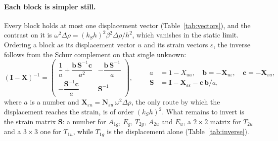 \documentclass[11pt,a4paper]{article}
\newcommand{\bN}{\mathbf{N}}
\newcommand{\bI}{\mathbf{I}}
\begin{document}
\paragraph{Each block is simpler still.} Every block holds at most one displacement vector
(Table~\ref{tab:vectors}), and the contrast on it is $\omega^2\Delta\rho=(k_Sh)^2\beta^2\Delta\rho/h^2$, which
vanishes in the static limit. Ordering a block as its displacement vector $u$ and its strain vectors
$\varepsilon$, the inverse follows from the Schur complement on that single unknown:
\begin{equation}\label{eq:schurcomplement}
  (\bI-\mathbf X)^{-1}=
  \begin{pmatrix}
    \dfrac1a+\dfrac{\mathbf b\,\mathbf S^{-1}\mathbf c}{a^2} & -\dfrac{\mathbf b\,\mathbf S^{-1}}{a}\\[8pt]
    -\dfrac{\mathbf S^{-1}\mathbf c}{a} & \mathbf S^{-1}
  \end{pmatrix},\qquad
  \begin{aligned}
    a&=1-X_{uu},\quad \mathbf b=-\mathbf X_{u\varepsilon},\quad \mathbf c=-\mathbf X_{\varepsilon u},\\
    \mathbf S&=\bI-\mathbf X_{\varepsilon\varepsilon}-\mathbf c\,\mathbf b/a ,
  \end{aligned}
\end{equation}
where $a$ is a number and $\mathbf X_{\varepsilon u}=\bN_{\varepsilon u}\,\omega^2\Delta\rho$, the only route by
which the displacement reaches the strain, is of order $(k_Sh)^2$. What remains to invert is the strain
matrix $\mathbf S$: a number for $A_{1g}$, $E_g$, $T_{2g}$, $A_{2u}$ and $E_u$, a $2\times2$ matrix for
$T_{2u}$ and a $3\times3$ one for $T_{1u}$, while $T_{1g}$ is the displacement alone
(Table~\ref{tab:inverse}).
\end{document}

